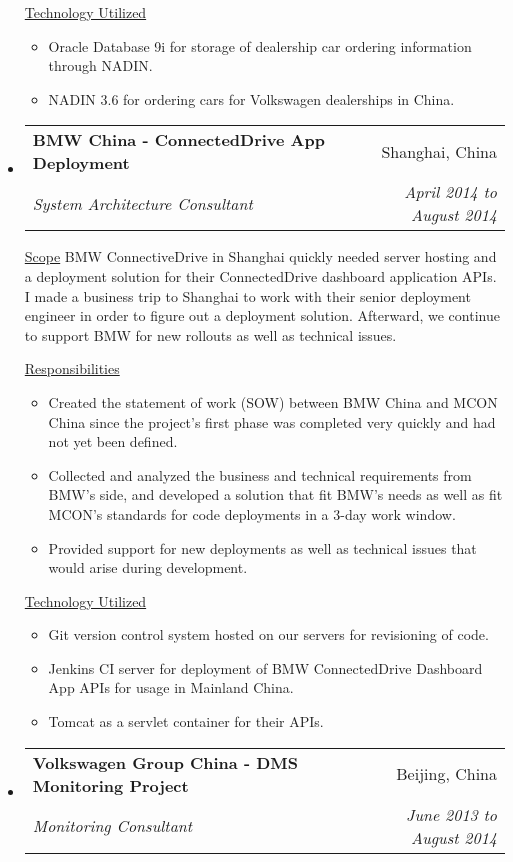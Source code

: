 \documentclass[a4paper,11pt]{article}
\makeatletter
\newcommand{\resitem}[1]{\item #1 \vspace{-2pt}}
\newcommand{\ressubheading}[4]{
\begin{tabular*}{6.5in}{l@{\cftdotfill{\cftsecdotsep}\extracolsep{\fill}}r}
        \textbf{#1} & #2 \\
        \textit{#3} & \textit{#4} \\
\end{tabular*}\vspace{-6pt}}
\makeatother
\begin{document}
\begin{itemize}
        \underline{Technology Utilized}
        \begin{itemize}
            \resitem{Oracle Database 9i for storage of dealership car ordering information through NADIN.}
            \resitem{NADIN 3.6 for ordering cars for Volkswagen dealerships in China.}
        \end{itemize}

    \item
        \ressubheading{BMW China - ConnectedDrive App Deployment}{Shanghai, China}{System Architecture Consultant}{April 2014 to August 2014}
        \linebreak
        \linebreak

        \underline{Scope}
        \linebreak
        \linebreak
        BMW ConnectiveDrive in Shanghai quickly needed server hosting and a deployment solution for their ConnectedDrive dashboard application APIs. I made a business trip to Shanghai to work with their senior deployment engineer in order to figure out a deployment solution. Afterward, we continue to support BMW for new rollouts as well as technical issues.

        \underline{Responsibilities}
        \begin{itemize}
            \resitem{Created the statement of work (SOW) between BMW China and MCON China since the project's first phase was completed very quickly and had not yet been defined.}
            \resitem{Collected and analyzed the business and technical requirements from BMW's side, and developed a solution that fit BMW's needs as well as fit MCON's standards for code deployments in a 3-day work window.}
            \resitem{Provided support for new deployments as well as technical issues that would arise during development.}
        \end{itemize}

        \underline{Technology Utilized}
        \begin{itemize}
            \resitem{Git version control system hosted on our servers for revisioning of code.}
            \resitem{Jenkins CI server for deployment of BMW ConnectedDrive Dashboard App APIs for usage in Mainland China.}
            \resitem{Tomcat as a servlet container for their APIs.}
        \end{itemize}

    \item
        \ressubheading{Volkswagen Group China - DMS Monitoring Project}{Beijing, China}{Monitoring Consultant}{June 2013 to August 2014}
        \linebreak
        \linebreak


\end{itemize}
\end{document}
